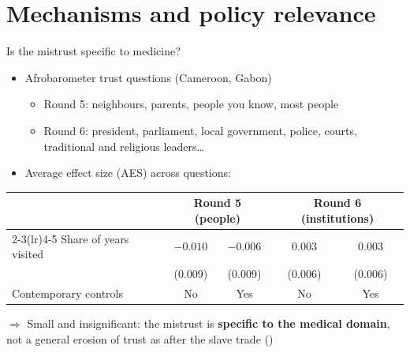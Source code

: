 \documentclass[aspectratio=1610]{beamer}
\newcommand{\highlight}[1]{\textcolor{accent}{\textbf{#1}}}
\newcommand{\refs}[1]{{\footnotesize\color{softgray}(\citealp{#1})}} %
\begin{document}
\section{Mechanisms and policy relevance}

\begin{frame}{Is the mistrust specific to medicine?}
  \begin{itemize}
    \item Afrobarometer trust questions (Cameroon, Gabon)
      \begin{itemize}
        \item Round 5: neighbours, parents, people you know, most people
        \item Round 6: president, parliament, local government, police, courts, traditional and religious leaders\dots
      \end{itemize}
    \item Average effect size (AES) across questions:
  \end{itemize}
  \centering
  \small
  \begin{tabular}{lcccc}
    \toprule
    & \multicolumn{2}{c}{Round 5 (people)} & \multicolumn{2}{c}{Round 6 (institutions)} \\
    \cmidrule(lr){2-3}\cmidrule(lr){4-5}
    Share of years visited & $-0.010$ & $-0.006$ & $0.003$ & $0.003$ \\
                           & (0.009)  & (0.009)  & (0.006) & (0.006) \\
    Contemporary controls  & No & Yes & No & Yes \\
    \bottomrule
  \end{tabular}

  \vspace{0.6em}
  \raggedright
  $\Rightarrow$ Small and insignificant: the mistrust is \highlight{specific to the medical domain},
  not a general erosion of trust as after the slave trade \refs{nunn_wantchekon_2011}
\end{frame}
\end{document}
